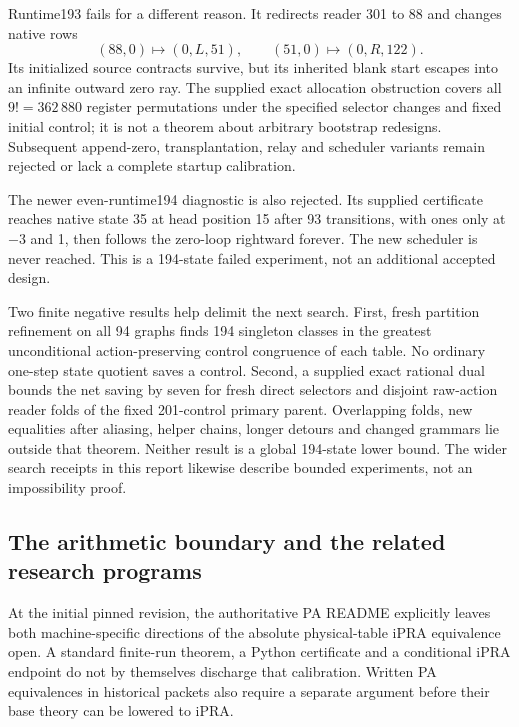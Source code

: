 Runtime193 fails for a different reason. It redirects reader 301 to 88
and changes native rows
\[
 (88,0)\mapsto(0,L,51),\qquad
 (51,0)\mapsto(0,R,122).
\]
Its initialized source contracts survive, but its inherited blank start
escapes into an infinite outward zero ray. The supplied exact allocation
obstruction covers all $9!=362\,880$ register permutations under the
specified selector changes and fixed initial control; it is not a
theorem about arbitrary bootstrap redesigns. Subsequent append-zero,
transplantation, relay and scheduler variants remain rejected or lack a
complete startup calibration.

The newer even-runtime194 diagnostic is also rejected. Its supplied
certificate reaches native state 35 at head position 15 after 93
transitions, with ones only at $-3$ and 1, then follows the zero-loop
rightward forever. The new scheduler is never reached. This is a
194-state failed experiment, not an additional accepted design.

Two finite negative results help delimit the next search. First, fresh
partition refinement on all 94 graphs finds 194 singleton classes in
the greatest unconditional action-preserving control congruence of
each table. No ordinary one-step state quotient saves a control.
Second, a supplied exact rational dual bounds the net saving by seven
for fresh direct selectors and disjoint raw-action reader folds of the
fixed 201-control primary parent. Overlapping folds, new equalities
after aliasing, helper chains, longer detours and changed grammars lie
outside that theorem. Neither result is a global 194-state lower
bound. The wider search receipts in this report likewise describe
bounded experiments, not an impossibility proof.

\subsection{The arithmetic boundary and the related research programs}

At the initial pinned revision, the authoritative PA README explicitly leaves
both machine-specific directions of the absolute physical-table
iPRA equivalence open. A standard finite-run theorem, a Python
certificate and a conditional iPRA endpoint do not by themselves
discharge that calibration. Written PA equivalences in historical
packets also require a separate argument before their base theory can
be lowered to iPRA.\cite{pa-readme}

